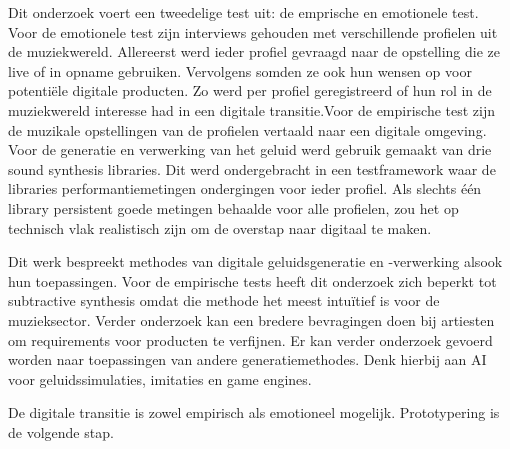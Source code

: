 Dit onderzoek voert een tweedelige test uit: de emprische en emotionele test. Voor de emotionele test zijn interviews gehouden met verschillende profielen uit de muziekwereld. Allereerst werd ieder profiel gevraagd naar de opstelling die ze live of in opname gebruiken. Vervolgens somden ze ook hun wensen op voor potentiële digitale producten. Zo werd per profiel geregistreerd of hun rol in de muziekwereld interesse had in een digitale transitie.\newline Voor de empirische test zijn de muzikale opstellingen van de profielen vertaald naar een digitale omgeving. Voor de generatie en verwerking van het geluid werd gebruik gemaakt van drie sound synthesis libraries. Dit werd ondergebracht in een testframework waar de libraries performantiemetingen ondergingen voor ieder profiel. Als slechts één library persistent goede metingen behaalde voor alle profielen, zou het op technisch vlak realistisch zijn om de overstap naar digitaal te maken.

Dit werk bespreekt methodes van digitale geluidsgeneratie en -verwerking alsook hun toepassingen. Voor de empirische tests heeft dit onderzoek zich beperkt tot subtractive synthesis omdat die methode het meest intuïtief is voor de muzieksector. Verder onderzoek kan een bredere bevragingen doen bij artiesten om requirements voor producten te verfijnen. Er kan verder onderzoek gevoerd worden naar toepassingen van andere generatiemethodes. Denk hierbij aan AI voor geluidssimulaties, imitaties en game engines.

De digitale transitie is zowel empirisch als emotioneel mogelijk. Prototypering is de volgende stap.
